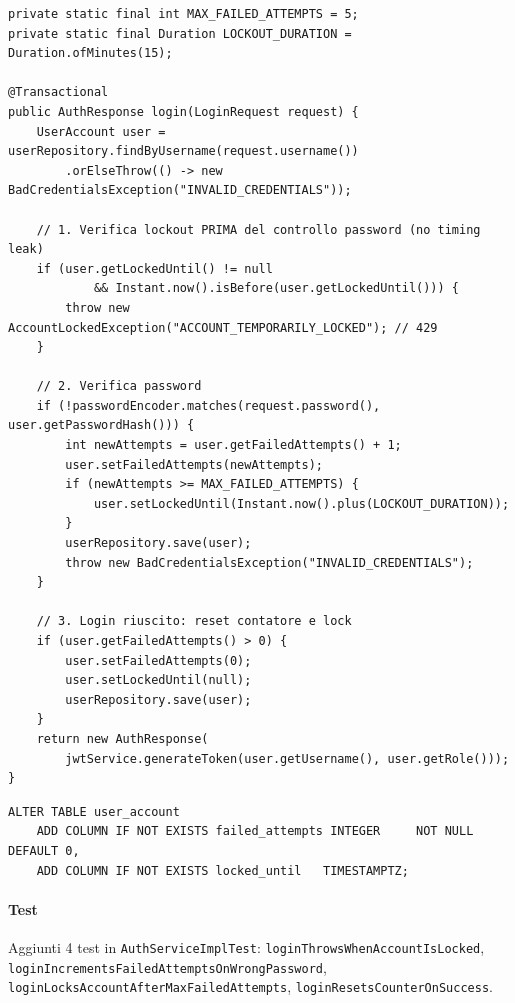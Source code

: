 ﻿\documentclass[a4paper,12pt]{report}
\begin{document}
\begin{securebox}[title={Codice Sicuro --- AuthServiceImpl.java (main)}]
\begin{lstlisting}[style=java]
private static final int MAX_FAILED_ATTEMPTS = 5;
private static final Duration LOCKOUT_DURATION = Duration.ofMinutes(15);

@Transactional
public AuthResponse login(LoginRequest request) {
    UserAccount user = userRepository.findByUsername(request.username())
        .orElseThrow(() -> new BadCredentialsException("INVALID_CREDENTIALS"));

    // 1. Verifica lockout PRIMA del controllo password (no timing leak)
    if (user.getLockedUntil() != null
            && Instant.now().isBefore(user.getLockedUntil())) {
        throw new AccountLockedException("ACCOUNT_TEMPORARILY_LOCKED"); // 429
    }

    // 2. Verifica password
    if (!passwordEncoder.matches(request.password(), user.getPasswordHash())) {
        int newAttempts = user.getFailedAttempts() + 1;
        user.setFailedAttempts(newAttempts);
        if (newAttempts >= MAX_FAILED_ATTEMPTS) {
            user.setLockedUntil(Instant.now().plus(LOCKOUT_DURATION));
        }
        userRepository.save(user);
        throw new BadCredentialsException("INVALID_CREDENTIALS");
    }

    // 3. Login riuscito: reset contatore e lock
    if (user.getFailedAttempts() > 0) {
        user.setFailedAttempts(0);
        user.setLockedUntil(null);
        userRepository.save(user);
    }
    return new AuthResponse(
        jwtService.generateToken(user.getUsername(), user.getRole()));
}
\end{lstlisting}
\end{securebox}

\begin{securebox}[title={V2\_\_add\_login\_lockout.sql --- Flyway migration}]
\begin{lstlisting}[style=yaml]
ALTER TABLE user_account
    ADD COLUMN IF NOT EXISTS failed_attempts INTEGER     NOT NULL DEFAULT 0,
    ADD COLUMN IF NOT EXISTS locked_until   TIMESTAMPTZ;
\end{lstlisting}
\end{securebox}

\paragraph{Test} Aggiunti 4 test in \texttt{AuthServiceImplTest}:
\texttt{loginThrowsWhenAccountIsLocked},
\texttt{loginIncrementsFailedAttemptsOnWrongPassword}, \\
\texttt{loginLocksAccountAfterMaxFailedAttempts},
\texttt{loginResetsCounterOnSuccess}.
\end{document}
